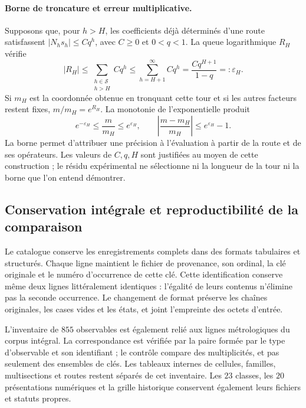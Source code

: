 \paragraph{Borne de troncature et erreur multiplicative.}
Supposons que, pour \(h>H\), les coefficients déjà déterminés d’une
route satisfassent \(|N_hs_h|\leq Cq^h\), avec \(C\geq0\) et
\(0<q<1\). La queue logarithmique \(R_H\) vérifie
\[
 |R_H|\leq\sum_{\substack{h\in\mathcal S\\h>H}}Cq^h
 \leq\sum_{h=H+1}^{\infty}Cq^h
 =\frac{Cq^{H+1}}{1-q}=:\varepsilon_H.
\]
Si \(m_H\) est la coordonnée obtenue en tronquant cette tour et si les autres
facteurs restent fixes, \(m/m_H=e^{R_H}\). La monotonie de
l’exponentielle produit
\[
 e^{-\varepsilon_H}\leq\frac{m}{m_H}\leq e^{\varepsilon_H},
 \qquad
 \left|\frac{m-m_H}{m_H}\right|\leq e^{\varepsilon_H}-1.
\]
La borne permet d’attribuer une précision à l’évaluation à partir de la route et de ses
opérateurs. Les valeurs de \(C,q,H\) sont justifiées au moyen de cette
construction ; le résidu expérimental ne sélectionne ni la longueur de la
tour ni la borne que l’on entend démontrer.

\subsection{Conservation intégrale et reproductibilité de la comparaison}
\label{vi:subsec:vi-catalogo-reproducible}

Le catalogue conserve les enregistrements complets dans des formats tabulaires et
structurés. Chaque ligne maintient le fichier de provenance, son ordinal,
la clé originale et le numéro d’occurrence de cette clé. Cette
identification conserve même deux lignes littéralement identiques :
l’égalité de leurs contenus n’élimine pas la seconde occurrence. Le changement
de format préserve les chaînes originales, les cases vides et les
états, et joint l’empreinte des octets d’entrée.

L'inventaire de \(855\) observables est également relié aux lignes
métrologiques du corpus intégral. La correspondance est vérifiée
par la paire formée par le type d'observable et son identifiant ; le
contrôle compare des multiplicités, et pas seulement des ensembles de clés. Les tableaux
internes de cellules, familles, multisections et routes restent séparés
de cet inventaire. Les \(23\) classes, les \(20\) présentations
numériques et la grille historique conservent également leurs fichiers et statuts
propres.

